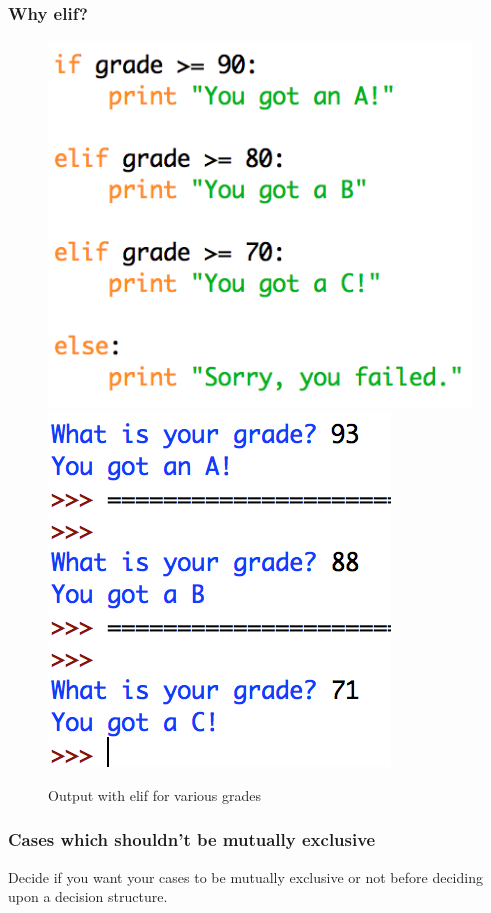 \documentclass{beamer}
\begin{document}
\begin{frame}[fragile]
\frametitle{Why elif?}

\begin{figure}[h]
\includegraphics[width=.48\linewidth]{IMG/elif_grade.png}
\includegraphics[width=.4\linewidth]{IMG/niceoutput.png}
\caption{Output with elif for various grades}
\end{figure}
\end{frame}


\begin{frame}
\frametitle{Cases which shouldn't be mutually exclusive}

Decide if you want your cases to be mutually exclusive or not before deciding upon a decision structure.
\end{frame}
\end{document}
